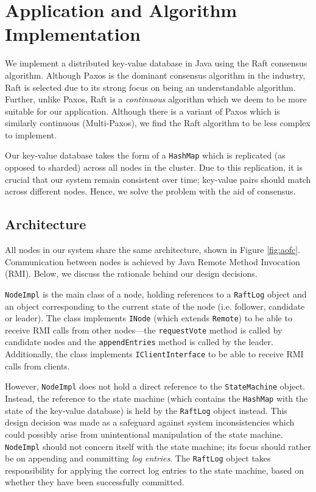 \documentclass[12pt, a4paper]{article}
\begin{document}
\section{Application and Algorithm Implementation} \label{sec:application}
We implement a distributed key-value database in Java using the Raft consensus algorithm. Although Paxos is the dominant consensus algorithm in the industry, Raft is selected due to its strong focus on being an understandable algorithm. Further, unlike Paxos, Raft is a \textit{continuous} algorithm which we deem to be more suitable for our application. Although there is a variant of Paxos which is similarly continuous (Multi-Paxos), we find the Raft algorithm to be less complex to implement. 

Our key-value database takes the form of a \texttt{HashMap} which is replicated (as opposed to sharded) across all nodes in the cluster. Due to this replication, it is crucial that our system remain consistent over time; key-value pairs should match across different nodes. Hence, we solve the problem with the aid of consensus. 

\subsection{Architecture}
All nodes in our system share the same architecture, shown in Figure \ref{fig:aofc}. Communication between nodes is achieved by Java Remote Method Invocation (RMI). Below, we discuss the rationale behind our design decisions.

\texttt{NodeImpl} is the main class of a node, holding references to a \texttt{RaftLog} object and an object corresponding to the current state of the node (i.e. follower, candidate or leader). The class implements \texttt{INode} (which extends \texttt{Remote}) to be able to receive RMI calls from other nodes---the \texttt{requestVote} method is called by candidate nodes and the \texttt{appendEntries} method is called by the leader. Additionally, the class implements \texttt{IClientInterface} to be able to receive RMI calls from clients.

However, \texttt{NodeImpl} does not hold a direct reference to the \texttt{StateMachine} object. Instead, the reference to the state machine (which contains the \texttt{HashMap} with the state of the key-value database) is held by the \texttt{RaftLog} object instead. This design decision was made as a safeguard against system inconsistencies which could possibly arise from unintentional manipulation of the state machine. \texttt{NodeImpl} should not concern itself with the state machine; its focus should rather be on appending and committing \textit{log entries}. The \texttt{RaftLog} object takes responsibility for applying the correct log entries to the state machine, based on whether they have been successfully committed.
\end{document}
